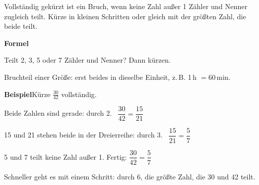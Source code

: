 \documentclass[11pt]{article}
\makeatletter
\newlength{\kr}
\newcommand{\karomerk}[2]{\protected@write\@auxout{}{\string\karoseite{#1}{#2}{\thepage}}}
\newcommand{\karoseite}[3]{\expandafter\xdef\csname karo@#1@#2\endcsname{#3}}
\makeatother
\begin{document}
\medskip
\par\vspace{3mm}\setlength{\kr}{\dimexpr\pagegoal-\pagetotal-10mm\relax}%
\ifdim\kr>12mm\karomerk{k}{A}\noindent{\scriptsize\color{mbgrau}Platz zum Rechnen}\par\nointerlineskip\vspace{1mm}\noindent
\begin{tikzpicture}\clip (0,0) rectangle ({\linewidth-0.5mm},\kr);\draw[black!16,line width=0.3pt,step=5mm] (0,0) grid (\linewidth,\kr);\end{tikzpicture}\fi\par
\clearpage\label{s:B}\noindent\colorbox{black!12}{}\hspace{3mm}{\Large\bfseries Vollständig kürzen}\par\smallskip
\noindent Vollständig gekürzt ist ein Bruch, wenn keine Zahl außer 1 Zähler und Nenner zugleich teilt. Kürze in kleinen Schritten oder gleich mit der größten Zahl, die beide teilt.\par\medskip
\noindent\textbf{Formel}\par\nopagebreak\noindent\hspace*{4mm}\begin{minipage}{\dimexpr\linewidth-4mm\relax}Teilt 2, 3, 5 oder 7 Zähler und Nenner? Dann kürzen. \par {\small Bruchteil einer Größe: erst beides in dieselbe Einheit, z.\,B. 1\,h $= 60$\,min.}\end{minipage}\par\medskip
\noindent\textbf{Beispiel}\quad Kürze $\frac{30}{42}$ vollständig.\par\smallskip
\noindent\par\noindent{}Beide Zahlen sind gerade: durch 2. \ $\dfrac{30}{42} = \dfrac{15}{21}$\par\smallskip\par\noindent{}15 und 21 stehen beide in der Dreierreihe: durch 3. \ $\dfrac{15}{21} = \dfrac{5}{7}$\par\smallskip\par\noindent{}5 und 7 teilt keine Zahl außer 1. Fertig: $\dfrac{30}{42} = \dfrac{5}{7}$\par\smallskip\par\noindent{}Schneller geht es mit einem Schritt: durch 6, die größte Zahl, die 30 und 42 teilt.\par\smallskip\par\medskip
\end{document}
